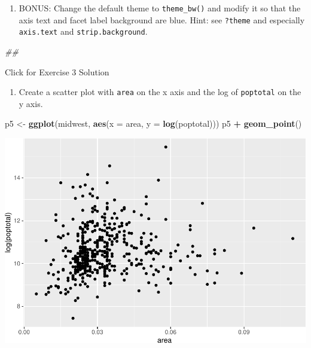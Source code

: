 \documentclass[
]{book}
\newenvironment{Shaded}{\begin{snugshade}}{\end{snugshade}}
\newcommand{\CommentTok}[1]{\textcolor[rgb]{0.56,0.35,0.01}{\textit{#1}}}
\newcommand{\DataTypeTok}[1]{\textcolor[rgb]{0.13,0.29,0.53}{#1}}
\newcommand{\KeywordTok}[1]{\textcolor[rgb]{0.13,0.29,0.53}{\textbf{#1}}}
\newcommand{\NormalTok}[1]{#1}
\newcommand{\OperatorTok}[1]{\textcolor[rgb]{0.81,0.36,0.00}{\textbf{#1}}}
\newcommand{\StringTok}[1]{\textcolor[rgb]{0.31,0.60,0.02}{#1}}
\providecommand{\tightlist}{%
  \setlength{\itemsep}{0pt}\setlength{\parskip}{0pt}}
\begin{document}
\begin{enumerate}
\def\labelenumi{\arabic{enumi}.}
\setcounter{enumi}{5}
\tightlist
\item
  BONUS: Change the default theme to \texttt{theme\_bw()} and modify it so that the axis text and facet label background are blue. Hint: see \texttt{?theme} and especially \texttt{axis.text} and \texttt{strip.background}.
\end{enumerate}

\begin{Shaded}
\begin{Highlighting}[]
\CommentTok{\#\# }
\end{Highlighting}
\end{Shaded}

{Click for Exercise 3 Solution}

\begin{alert}

\begin{enumerate}
\def\labelenumi{\arabic{enumi}.}
\tightlist
\item
  Create a scatter plot with \texttt{area} on the x axis and the log of \texttt{poptotal} on the y axis.
\end{enumerate}

\begin{Shaded}
\begin{Highlighting}[]
\NormalTok{p5 \textless{}{-}}\StringTok{ }\KeywordTok{ggplot}\NormalTok{(midwest, }\KeywordTok{aes}\NormalTok{(}\DataTypeTok{x =}\NormalTok{ area, }\DataTypeTok{y =} \KeywordTok{log}\NormalTok{(poptotal))) }
\NormalTok{p5 }\OperatorTok{+}\StringTok{ }\KeywordTok{geom\_point}\NormalTok{() }
\end{Highlighting}
\end{Shaded}

\includegraphics{R/Rgraphics/figures/unnamed-chunk-210-1.pdf}


\end{alert}
\end{document}
